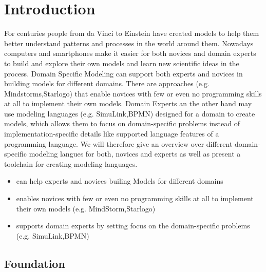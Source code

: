 \documentclass[runningheads,a4paper]{llncs}
\begin{document}
\section{Introduction}
\label{sec:introduction}
For centuries people from da Vinci to Einstein have created models to help them better 
understand patterns and processes in the world around them. 
Nowadays computers and smartphones make it easier for both novices and domain experts to build 
and explore their own models and learn new scientific ideas in the process.
Domain Specific Modeling can support both experts and novices in building models for different domains.
There are approaches (e.g. Mindstorms,Starlogo) that enable novices with few or even no programming 
skills at all to implement their own models.
Domain Experts an the other hand may use modeling languages (e.g. SimuLink,BPMN) designed for a domain to create models, 
which allows them to focus on domain-specific problems instead of implementation-specific details like supported 
language features of a programming language.
We will therefore give an overview over different domain-specific modeling langues for both, novices and experts
as well as present a toolchain for creating modeling languages. 

\begin{itemize}
 \item can help experts and novices builing Models for different domains
 \item enables novices with few or even no programming skills at all to implement their own models (e.g. MindStorm,Starlogo)
 \item supports domain experts by setting focus on the domain-specific problems (e.g. SimuLink,BPMN)
  \end{itemize}


\subsection{Foundation}
\label{subsec:introduction}
\end{document}
